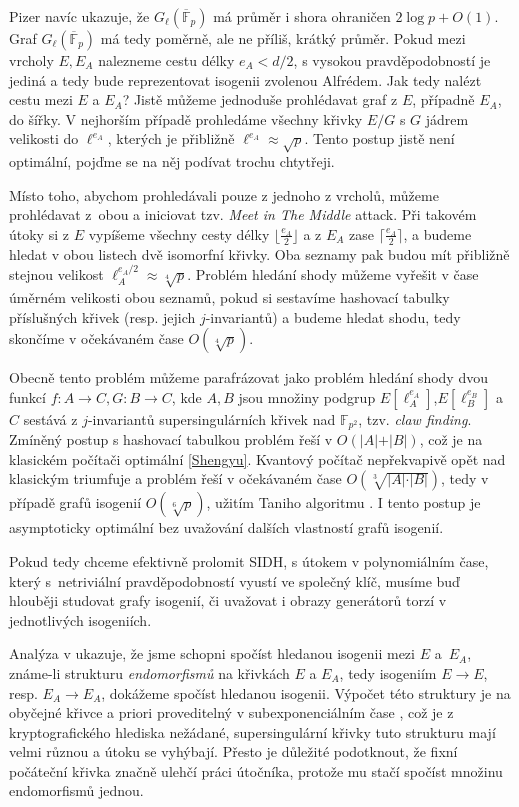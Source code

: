 \documentclass[12pt]{report}
\begin{document}
Pizer \cite[Thm. 1.]{Pizer} navíc ukazuje, že $G_{\ell} (\overline{\mathbb{F}}_p)$ má průměr i shora ohraničen $2 \log p + O(1)$. Graf $G_{\ell} (\overline{\mathbb{F}}_p)$ má tedy poměrně, ale ne příliš,  krátký průměr. Pokud mezi vrcholy $E,E_A$ nalezneme cestu délky $e_A < d/2$, s vysokou pravděpodobností je jediná a tedy bude reprezentovat isogenii zvolenou Alfrédem. Jak tedy nalézt cestu mezi $E$ a $E_A$? Jistě můžeme jednoduše prohlédavat graf z $E$, případně $E_A$, do šířky. V nejhorším případě prohledáme všechny křivky $E/G$ s $G$ jádrem velikosti do $\ell^{e_A}$, kterých je přibližně $\ell^{e_A} \approx \sqrt{p}$. Tento postup jistě není optimální, pojďme se na něj podívat trochu chtytřeji.

Místo toho, abychom prohledávali pouze z jednoho z vrcholů, můžeme prohlédavat z~obou a iniciovat tzv. \textit{Meet in The Middle} attack. Při takovém útoky si z $E$ vypíšeme všechny cesty délky $\lfloor \frac{e_A}{2} \rfloor$ a z $E_A$ zase $\lceil \frac{e_A}{2} \rceil$, a budeme hledat v obou listech dvě isomorfní křivky. Oba seznamy pak budou mít přibližně stejnou velikost $\ell_A ^ {e_A/2} \approx \sqrt[4]{p}$. Problém hledání shody můžeme vyřešit v čase úměrném velikosti obou seznamů, pokud si sestavíme hashovací tabulky příslušných křivek (resp. jejich $j$-invariantů) a budeme hledat shodu, tedy skončíme v očekávaném čase $O(\sqrt[4]{p})$.

Obecně tento problém můžeme parafrázovat jako problém hledání shody dvou funkcí $f : A \longrightarrow C, G : B \longrightarrow C$, kde $A,B$ jsou množiny podgrup $E[\ell_A ^{e_A}]$,$E[\ell_B ^{e_B}]$ a $C$ sestává z $j$-invariantů supersingulárních křivek nad $\mathbb{F}_{p^2}$, tzv. \textit{claw finding}. Zmíněný postup s hashovací tabulkou problém řeší v $O(\vert A\vert + \vert B \vert)$, což je na klasickém počítači optimální \ref{Shengyu}. Kvantový počítač nepřekvapivě opět nad klasickým triumfuje a problém řeší v očekávaném čase $O( \sqrt[3]{\vert A \vert \cdot \vert B \vert})$, tedy v případě grafů isogenií $O(\sqrt[6]{p})$, užitím Taniho algoritmu \cite{Tani}. I tento postup je asymptoticky optimální bez uvažování dalších vlastností grafů isogenií. 

Pokud tedy chceme efektivně prolomit SIDH, s útokem v polynomiálním čase, který s~netriviální pravděpodobností vyustí ve společný klíč, musíme buď hlouběji studovat grafy isogenií, či uvažovat i obrazy generátorů torzí v jednotlivých isogeniích.

Analýza v \cite[Sec. 4.2]{Galbraith4} ukazuje, že jsme schopni spočíst hledanou isogenii mezi $E$ a~$E_A$, známe-li strukturu \textit{endomorfismů} na křivkách $E$ a $E_A$, tedy isogeniím $E \longrightarrow E$, resp. $E_A \longrightarrow E_A$, dokážeme spočíst hledanou isogenii. Výpočet této struktury je na obyčejné křivce a priori proveditelný v subexponenciálním čase \cite{Bisson}, což je z kryptografického hlediska nežádané, supersingulární křivky tuto strukturu mají velmi různou a útoku se vyhýbají. Přesto je důležité podotknout, že fixní počáteční křivka značně ulehčí práci útočníka, protože mu stačí spočíst množinu endomorfismů jednou.
\end{document}
